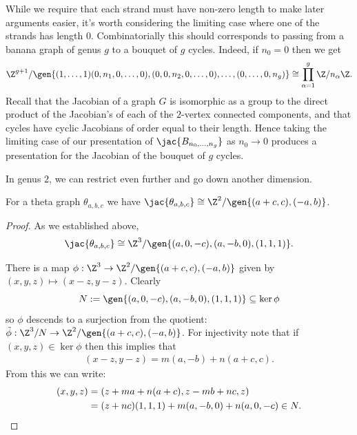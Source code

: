\begin{rema}
    While we require that each strand must have non-zero length to make later arguments easier, it's worth considering the limiting case where one of the strands has length $0$. Combinatorially this should corresponds to passing from a banana graph of genus $g$ to a bouquet of $g$ cycles. Indeed, if $n_0 = 0$ then we get
    \begin{align*}
        \Z^{g+1}/\gen{(1,\dots,1)(0,n_1,0,\dots,0),(0,0,n_2,0,\dots,0),\dots,(0,\dots,0,n_g)} \cong \prod_{\alpha = 1}^g\Z/n_\alpha\Z.
    \end{align*}
    Recall that the Jacobian of a graph $G$ is isomorphic as a group to the direct product of the Jacobian's of each of the $2$-vertex connected components, and that cycles have cyclic Jacobians of order equal to their length. Hence taking the limiting case of our presentation of $\jac{B_{n_0,\dots,n_g}}$ as $n_0 \to 0$ produces a presentation for the Jacobian of the bouquet of $g$ cycles.
\end{rema}


In genus $2$, we can restrict even further and go down another dimension.

\begin{prop}
    For a theta graph $\theta_{a,b,c}$ we have $\jac{\theta_{a,b,c}} \cong \Z^2/\gen{(a+c,c),(-a,b)}$.
\end{prop}


\begin{proof}
    
As we established above,
\begin{align*}
    \jac{\theta_{a,b,c}} \cong \Z^3/\gen{(a,0,-c),(a,-b,0),(1,1,1)}.
\end{align*}

There is a map $\phi:\Z^3 \to \Z^2/\gen{(a+c,c),(-a,b)}$ given by $(x,y,z)\mapsto (x-z,y-z)$. Clearly $$N:=\gen{(a,0,-c),(a,-b,0),(1,1,1)} \subseteq \ker{\phi}$$ so $\phi$ descends to a surjection from the quotient: $\Tilde{\phi}:\Z^3/N\to \Z^2/\gen{(a+c,c),(-a,b)}$. For injectivity note that if $(x,y,z) \in \ker{\phi}$ then this implies that 
\begin{align*}
    (x-z,y-z) = m(a,-b)+n(a+c,c).
\end{align*}
From this we can write:
\begin{align*}
    (x,y,z) &= (z+ma+n(a+c),z-mb+nc,z) \\&= (z+nc)(1,1,1) + m(a,-b,0)+n(a,0,-c) \in N. \qedhere
\end{align*}
\end{proof}

